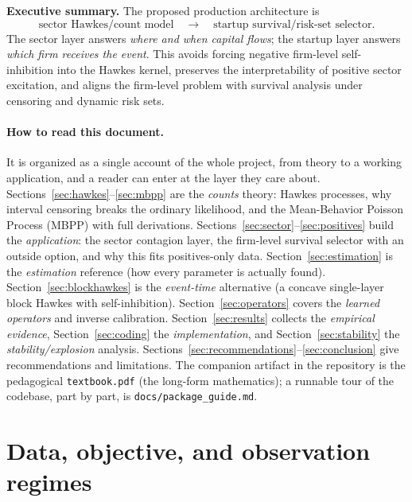 \documentclass[11pt]{article}
\theoremstyle{plain}
\theoremstyle{definition}
\theoremstyle{remark}
\newcommand{\code}[1]{\texttt{#1}}
\begin{document}
\noindent\textbf{Executive summary.}
The proposed production architecture is
\[
\boxed{\text{sector Hawkes/count model}} \quad \longrightarrow \quad
\boxed{\text{startup survival/risk-set selector}}.
\]
The sector layer answers \emph{where and when capital flows}; the startup layer answers \emph{which firm receives the event}. This avoids forcing negative firm-level self-inhibition into the Hawkes kernel, preserves the interpretability of positive sector excitation, and aligns the firm-level problem with survival analysis under censoring and dynamic risk sets.

\paragraph{How to read this document.}
It is organized as a single account of the whole project, from theory to a working application, and a reader can enter at the layer they care about. Sections~\ref{sec:hawkes}--\ref{sec:mbpp} are the \emph{counts} theory: Hawkes processes, why interval censoring breaks the ordinary likelihood, and the Mean-Behavior Poisson Process (MBPP) with full derivations. Sections~\ref{sec:sector}--\ref{sec:positives} build the \emph{application}: the sector contagion layer, the firm-level survival selector with an outside option, and why this fits positives-only data. Section~\ref{sec:estimation} is the \emph{estimation} reference (how every parameter is actually found). Section~\ref{sec:blockhawkes} is the \emph{event-time} alternative (a concave single-layer block Hawkes with self-inhibition). Section~\ref{sec:operators} covers the \emph{learned operators} and inverse calibration. Section~\ref{sec:results} collects the \emph{empirical evidence}, Section~\ref{sec:coding} the \emph{implementation}, and Section~\ref{sec:stability} the \emph{stability/explosion} analysis. Sections~\ref{sec:recommendations}--\ref{sec:conclusion} give recommendations and limitations. The companion artifact in the repository is the pedagogical \code{textbook.pdf} (the long-form mathematics); a runnable tour of the codebase, part by part, is \code{docs/package\_guide.md}.

\tableofcontents
\newpage

\section{Data, objective, and observation regimes}
\label{sec:data}
\end{document}
